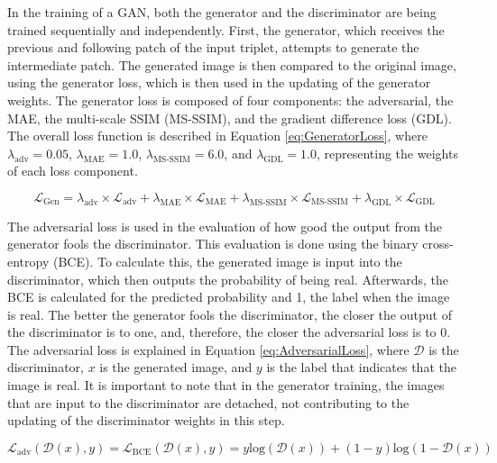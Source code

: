 In the training of a GAN, both the generator and the discriminator are being trained sequentially and independently. First, the generator, which receives the previous and following patch of the input triplet, attempts to generate the intermediate patch. The generated image is then compared to the original image, using the generator loss, which is then used in the updating of the generator weights. The generator loss is composed of four components: the adversarial, the MAE, the multi-scale SSIM (MS-SSIM), and the gradient difference loss (GDL). The overall loss function is described in Equation \ref{eq:GeneratorLoss}, where $\lambda_{\text{adv}}=0.05$, $\lambda_{\text{MAE}}=1.0$, $\lambda_{\text{MS-SSIM}}=6.0$, and $\lambda_{\text{GDL}}=1.0$, representing the weights of each loss component.

\begin{equation}
	\mathcal{L}_{\text{Gen}} = \lambda_{\text{adv}} \times \mathcal{L}_{\text{adv}} + \lambda_{\text{MAE}} \times \mathcal{L}_{\text{MAE}} + \lambda_{\text{MS-SSIM}} \times \mathcal{L}_{\text{MS-SSIM}} + \lambda_{\text{GDL}} \times \mathcal{L}_{\text{GDL}}
	\label{eq:GeneratorLoss}
\end{equation}

The adversarial loss is used in the evaluation of how good the output from the generator fools the discriminator. This evaluation is done using the binary cross-entropy (BCE). To calculate this, the generated image is input into the discriminator, which then outputs the probability of being real. Afterwards, the BCE is calculated for the predicted probability and 1, the label when the image is real. The better the generator fools the discriminator, the closer the output of the discriminator is to one, and, therefore, the closer the adversarial loss is to 0. The adversarial loss is explained in Equation \ref{eq:AdversarialLoss}, where $\mathcal{D}$ is the discriminator, $x$ is the generated image, and $y$ is the label that indicates that the image is real. It is important to note that in the generator training, the images that are input to the discriminator are detached, not contributing to the updating of the discriminator weights in this step.

\begin{equation}
	\mathcal{L}_{\text{adv}} (\mathcal{D}(x), y) = \mathcal{L}_{\text{BCE}} (\mathcal{D}(x), y) = y \text{log}(\mathcal{D}(x)) + (1 - y)\text{log}(1 - \mathcal{D}(x))
	\label{eq:AdversarialLoss}
\end{equation}

